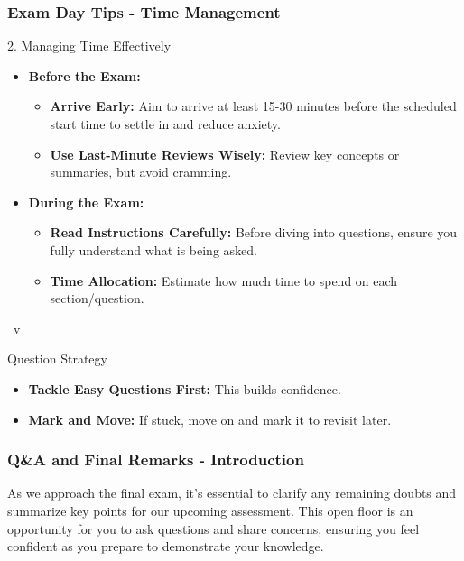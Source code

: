\documentclass{beamer}
\begin{document}
\begin{frame}[fragile]
    \frametitle{Exam Day Tips - Time Management}
    \begin{block}{2. Managing Time Effectively}
        \begin{itemize}
            \item \textbf{Before the Exam:}
                \begin{itemize}
                    \item \textbf{Arrive Early:} Aim to arrive at least 15-30 minutes before the scheduled start time to settle in and reduce anxiety.
                    \item \textbf{Use Last-Minute Reviews Wisely:} Review key concepts or summaries, but avoid cramming.
                \end{itemize}
            \item \textbf{During the Exam:}
                \begin{itemize}
                    \item \textbf{Read Instructions Carefully:} Before diving into questions, ensure you fully understand what is being asked.
                    \item \textbf{Time Allocation:} Estimate how much time to spend on each section/question.
                \end{itemize}
        \end{itemize}
    \end{block}
\    v
   
\begin{block}{Question Strategy}
        \begin{itemize}
            \item \textbf{Tackle Easy Questions First:} This builds confidence.
            \item \textbf{Mark and Move:} If stuck, move on and mark it to revisit later.
        \end{itemize}
\end{block}
\end{frame}

\begin{frame}[fragile]
    \frametitle{Q\&A and Final Remarks - Introduction}
    As we approach the final exam, it's essential to clarify any remaining doubts and summarize key points for our upcoming assessment. This open floor is an opportunity for you to ask questions and share concerns, ensuring you feel confident as you prepare to demonstrate your knowledge.
\end{frame}
\end{document}
